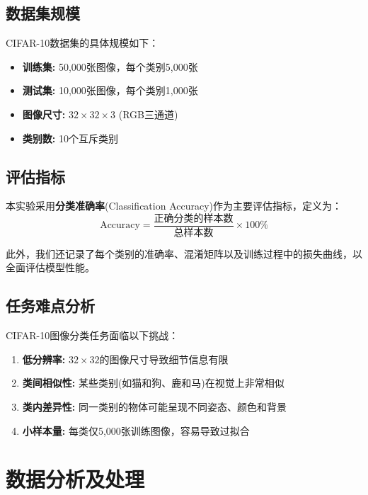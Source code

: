 \documentclass[12pt,a4paper]{article}
\begin{document}
\subsection{数据集规模}

CIFAR-10数据集的具体规模如下：
\begin{itemize}[leftmargin=2em]
    \item \textbf{训练集:} 50,000张图像，每个类别5,000张
    \item \textbf{测试集:} 10,000张图像，每个类别1,000张
    \item \textbf{图像尺寸:} $32 \times 32 \times 3$ (RGB三通道)
    \item \textbf{类别数:} 10个互斥类别
\end{itemize}

\subsection{评估指标}

本实验采用\textbf{分类准确率}(Classification Accuracy)作为主要评估指标，定义为：
\begin{equation}
    \text{Accuracy} = \frac{\text{正确分类的样本数}}{\text{总样本数}} \times 100\%
\end{equation}

此外，我们还记录了每个类别的准确率、混淆矩阵以及训练过程中的损失曲线，以全面评估模型性能。

\subsection{任务难点分析}

CIFAR-10图像分类任务面临以下挑战：
\begin{enumerate}[leftmargin=2em]
    \item \textbf{低分辨率:} $32 \times 32$的图像尺寸导致细节信息有限
    \item \textbf{类间相似性:} 某些类别(如猫和狗、鹿和马)在视觉上非常相似
    \item \textbf{类内差异性:} 同一类别的物体可能呈现不同姿态、颜色和背景
    \item \textbf{小样本量:} 每类仅5,000张训练图像，容易导致过拟合
\end{enumerate}

\section{数据分析及处理}
\end{document}
